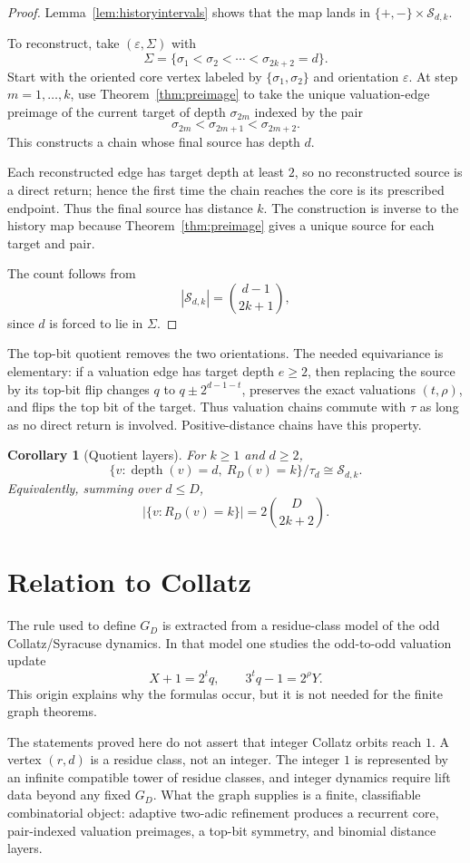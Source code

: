 \documentclass[11pt]{article}
\newtheorem{corollary}[theorem]{Corollary}
\theoremstyle{definition}
\theoremstyle{remark}
\newcommand{\depth}{\operatorname{depth}}
\newcommand{\Sfam}{\mathcal S}
\newcommand{\eps}{\varepsilon}
\begin{document}
\begin{proof}
Lemma~\ref{lem:historyintervals} shows that the map lands in $\{+,-\}\times\Sfam_{d,k}$.

To reconstruct, take $(\eps,\Sigma)$ with
\[
\Sigma=\{\sigma_1<\sigma_2<\cdots<\sigma_{2k+2}=d\}.
\]
Start with the oriented core vertex labeled by $\{\sigma_1,\sigma_2\}$ and orientation $\eps$.  At step $m=1,\ldots,k$, use Theorem~\ref{thm:preimage} to take the unique valuation-edge preimage of the current target of depth $\sigma_{2m}$ indexed by the pair
\[
\sigma_{2m}<\sigma_{2m+1}<\sigma_{2m+2}.
\]
This constructs a chain whose final source has depth $d$.

Each reconstructed edge has target depth at least $2$, so no reconstructed source is a direct return; hence the first time the chain reaches the core is its prescribed endpoint.  Thus the final source has distance $k$.  The construction is inverse to the history map because Theorem~\ref{thm:preimage} gives a unique source for each target and pair.

The count follows from
\[
|\Sfam_{d,k}|=\binom{d-1}{2k+1},
\]
since $d$ is forced to lie in $\Sigma$.
\end{proof}

The top-bit quotient removes the two orientations.  The needed equivariance is elementary: if a valuation edge has target depth $e\ge2$, then replacing the source by its top-bit flip changes $q$ to $q\pm2^{d-1-t}$, preserves the exact valuations $(t,\rho)$, and flips the top bit of the target.  Thus valuation chains commute with $\tau$ as long as no direct return is involved.  Positive-distance chains have this property.

\begin{corollary}[Quotient layers]\label{cor:quotient}
For $k\ge1$ and $d\ge2$,
\[
\{v:\depth(v)=d,\ R_D(v)=k\}/\tau_d
\cong
\Sfam_{d,k}.
\]
Equivalently, summing over $d\le D$,
\[
\bigl|\{v:R_D(v)=k\}\bigr|=2\binom{D}{2k+2}.
\]
\end{corollary}

\section{Relation to Collatz}\label{sec:collatz}

The rule used to define $G_D$ is extracted from a residue-class model of the odd Collatz/Syracuse dynamics.  In that model one studies the odd-to-odd valuation update
\[
X+1=2^tq,
\qquad
3^tq-1=2^\rho Y.
\]
This origin explains why the formulas occur, but it is not needed for the finite graph theorems.

The statements proved here do not assert that integer Collatz orbits reach $1$.  A vertex $(r,d)$ is a residue class, not an integer.  The integer $1$ is represented by an infinite compatible tower of residue classes, and integer dynamics require lift data beyond any fixed $G_D$.  What the graph supplies is a finite, classifiable combinatorial object: adaptive two-adic refinement produces a recurrent core, pair-indexed valuation preimages, a top-bit symmetry, and binomial distance layers.
\end{document}
